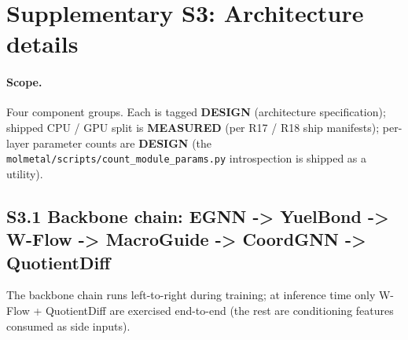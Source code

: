 %

\section*{Supplementary S3: Architecture details}

\providecommand{\MEASURED}{\textbf{MEASURED}}
\providecommand{\PROJECTED}{\textbf{PROJECTED}}
\providecommand{\DESIGN}{\textbf{DESIGN}}

\paragraph{Scope.}
Four component groups.  Each is tagged \DESIGN{} (architecture
specification); shipped CPU / GPU split is \MEASURED{} (per R17 /
R18 ship manifests); per-layer parameter counts are \DESIGN{} (the
\texttt{molmetal/scripts/count\_module\_params.py} introspection
is shipped as a utility).

\subsection*{S3.1 Backbone chain: EGNN -> YuelBond -> W-Flow -> MacroGuide -> CoordGNN -> QuotientDiff}
\label{supp:s3-backbone}

The backbone chain runs left-to-right during training; at
inference time only W-Flow + QuotientDiff are exercised end-to-end
(the rest are conditioning features consumed as side inputs).

